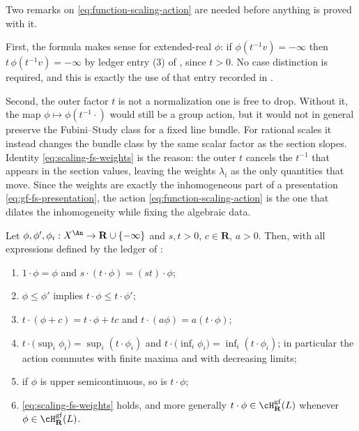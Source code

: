 Two remarks on \eqref{eq:function-scaling-action} are needed before anything
is proved with it.

First, the formula makes sense for extended-real $\phi$: if
$\phi(t^{-1}v)=-\infty$ then $t\,\phi(t^{-1}v)=-\infty$ by ledger entry
(3) of , since $t>0$.  No case distinction
is required, and this is exactly the use of that entry recorded in
.

Second, the outer factor $t$ is not a normalization one is free to drop.
Without it, the map $\phi\mapsto\phi(t^{-1}\cdot)$ would still be a group
action, but it would not in general preserve the Fubini--Study class for a
fixed line bundle. For rational scales it instead changes the bundle class
by the same scalar factor as the section slopes.  Identity \eqref{eq:scaling-fs-weights} is the reason: the outer
$t$ cancels the $t^{-1}$ that appears in the section values, leaving the
weights $\lambda_i$ as the only quantities that move.  Since the weights
are exactly the inhomogeneous part of a presentation
\eqref{eq:gf-fs-presentation}, the action \eqref{eq:function-scaling-action}
is the one that dilates the inhomogeneity while fixing the algebraic data.

\begin{lemma}
\label{lem:ch35-action-basic}
Let $\phi,\phi',\phi_i:X^{\An}\to\mathbf R\cup\{-\infty\}$ and
$s,t>0$, $c\in\mathbf R$, $a>0$.  Then, with all expressions defined
by the ledger of :
\begin{enumerate}
\item $1\cdot\phi=\phi$ and $s\cdot(t\cdot\phi)=(st)\cdot\phi$;
\item $\phi\leq\phi'$ implies $t\cdot\phi\leq t\cdot\phi'$;
\item $t\cdot(\phi+c)=t\cdot\phi+tc$ and
 $t\cdot(a\phi)=a(t\cdot\phi)$;
\item $t\cdot\bigl(\sup_i\phi_i\bigr)=\sup_i(t\cdot\phi_i)$ and
 $t\cdot\bigl(\inf_i\phi_i\bigr)=\inf_i(t\cdot\phi_i)$; in particular the
 action commutes with finite maxima and with decreasing limits;
\item if $\phi$ is upper semicontinuous, so is $t\cdot\phi$;
\item \eqref{eq:scaling-fs-weights} holds, and more generally
 $t\cdot\phi\in\cH^{\mathrm{gf}}_{\mathbf R}(L)$ whenever
 $\phi\in\cH^{\mathrm{gf}}_{\mathbf R}(L)$.
\end{enumerate}
\par
\end{lemma}

